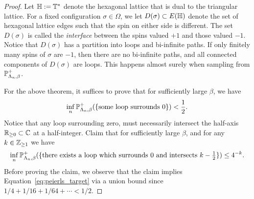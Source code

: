 \begin{proof}
    Let $\H:=\T^*$ denote the hexagonal lattice
    that is dual to the triangular lattice.
    For a fixed configuration $\sigma\in\Omega$,
    we let $D(\sigma)\subset E(\H)$ denote the set of
    hexagonal lattice edges such that the spin on either side is
    different.
    The set $D(\sigma)$ is called the
    \emph{interface} between the spins valued $+1$
    and those valued $-1$.
    Notice that $D(\sigma)$ has a partition into
    loops and bi-infinite paths.
    If only finitely many spins of $\sigma$ are $-1$,
    then there are no bi-infinite paths,
    and all connected components of $D(\sigma)$
    are loops.
    This happens almost surely when sampling from $\P_{\Lambda_n,\beta}^+$.

    For the above theorem, it suffices to prove that
    for sufficiently large $\beta$, we have
    \begin{equation}
        \label{eq:peierls_target}
        \inf_{n}\P_{\Lambda_n,\beta}^+
        (\{\text{some loop surrounds $0$}\})
        <\frac12.
    \end{equation}
    Notice that any loop surrounding zero,
    must necessarily intersect the half-axis
    $\R_{\geq 0}\subset\C$ at a half-integer.
    Claim that for sufficiently large $\beta$,
    and for any $k\in\Z_{\geq 1}$
    we have 
    \begin{equation}
        \label{eq:peierls_target_2}
        \inf_{n}\P_{\Lambda_n,\beta}^+
        (\{\text{there exists a loop which surrounds $0$ and intersects $k-\tfrac12$}\})
        \leq 4^{-k}.
    \end{equation}
    Before proving the claim, we observe that the claim
    implies Equation~\eqref{eq:peierls_target}
    via a union bound since $1/4+1/16+1/64+\cdots<1/2$.


\end{proof}
